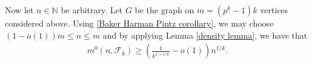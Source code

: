 \documentclass[12pt]{article}
\newtheorem{claim}{Claim}
\begin{document}

    Now let $n\in\mathbb N$ be arbitrary. Let $G$ be the graph on $m=(p^k-1)k$ vertices considered above. Using \autoref{Baker Harman Pintz corollary}, we may choose $(1-o(1))m \leq n \leq m$ and by applying Lemma \ref{density lemma}, we have that%
    $$\begin{aligned}
       m^0(n,\mathcal F_k)\ge\left(\frac{1}{k^{1+1/k}}-o(1)\right)n^{1/k}.
    \end{aligned}$$
\end{document}
